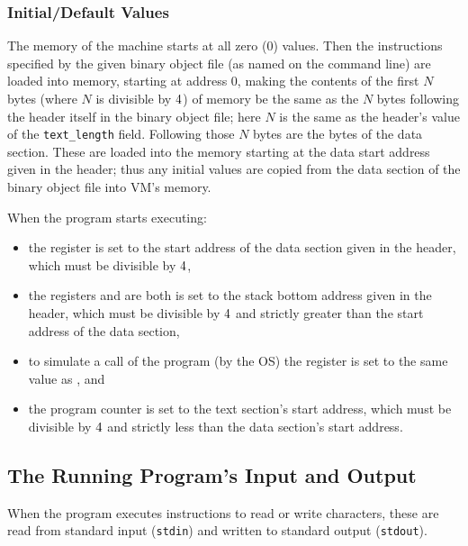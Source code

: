 \documentclass[11pt,letterpaper]{article}
\begin{document}
\subsubsection{Initial/Default Values}
\label{sec:initial}

The memory of the machine starts at all zero ($0$) values.
Then the instructions specified by the given binary object file
(as named on the command line) are loaded into memory,
starting at address $0$, making the contents of the first $N$ bytes
(where $N$ is divisible by $4$) 
of memory be the same as the $N$ bytes following the header itself in
the binary object file; here $N$ is the same as the header's value of
the \lstinline!text_length! field.
Following those $N$ bytes are the bytes of the data section.
These are loaded into the memory starting at the data start address
given in the header; thus any initial values are copied from the
data section of the binary object file into VM's memory.

When the program starts executing:
\begin{itemize}
\item
the register {\GP} is set to the start address of the data section
given in the header,
which must be divisible by $4$,

\item
the registers {\FP} and {\SP} are both is set to the stack bottom
address given in the header, which must be divisible by $4$
and strictly greater than the start address of the data section,

\item
to simulate a call of the program (by the OS) the {\AZERO} register is
set to the same value as {\FP}, and

\item
the program counter {\PC} is set to the text section's start address,
which must be divisible by $4$ and strictly less than the
data section's start address.
\end{itemize}


\subsection{The Running Program's Input and Output}

When the program executes instructions to read or write characters,
these are read from standard input (\texttt{stdin}) and written to
standard output (\texttt{stdout}).
\end{document}
